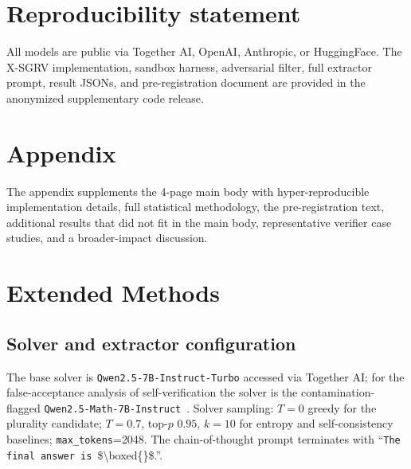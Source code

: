 \documentclass{article}
\begin{document}
\section*{Reproducibility statement}
All models are public via Together AI, OpenAI, Anthropic, or HuggingFace. The X-SGRV implementation, sandbox harness, adversarial filter, full extractor prompt, result JSONs, and pre-registration document are provided in the anonymized supplementary code release.




\newpage
\appendix
\onecolumn

\section*{Appendix}

The appendix supplements the 4-page main body with hyper-reproducible implementation
details, full statistical methodology, the pre-registration text, additional
results that did not fit in the main body, representative verifier
case studies, and a broader-impact discussion.

\section{Extended Methods}
\label{app:methods}

\subsection{Solver and extractor configuration}
\label{app:models}

The base solver is \texttt{Qwen2.5-7B-Instruct-Turbo} accessed via Together AI; for the false-acceptance analysis of self-verification the solver is the contamination-flagged \texttt{Qwen2.5-Math-7B-Instruct}~\citep{wu2025contam}. Solver sampling: $T{=}0$ greedy for the plurality candidate; $T{=}0.7$, top-$p$ $0.95$, $k{=}10$ for entropy and self-consistency baselines; \texttt{max\_tokens}{=}2048. The chain-of-thought prompt terminates with ``\texttt{The final answer is}~\$\textbackslash boxed\{\}\$.''.
\end{document}
